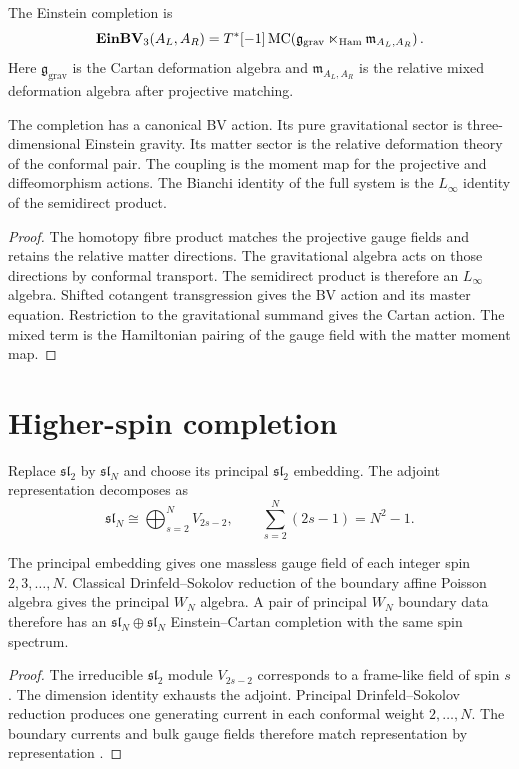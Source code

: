 \begin{definition}
The Einstein completion is
\[
 \mathbf{EinBV}_3(A_L,A_R)
 =T^*[-1]\operatorname{MC}\!\left(
   \mathfrak g_{\mathrm{grav}}
   \ltimes_{\mathrm{Ham}}
   \mathfrak m_{A_L,A_R}
  \right).
\]
Here $\mathfrak g_{\mathrm{grav}}$ is the Cartan deformation algebra and $\mathfrak m_{A_L,A_R}$ is the relative mixed deformation algebra after projective matching.
\end{definition}

\begin{theorem}
The completion has a canonical BV action.  Its pure gravitational sector is three-dimensional Einstein gravity.  Its matter sector is the relative deformation theory of the conformal pair.  The coupling is the moment map for the projective and diffeomorphism actions.  The Bianchi identity of the full system is the $L_\infty$ identity of the semidirect product.
\end{theorem}
\begin{proof}
The homotopy fibre product matches the projective gauge fields and retains the relative matter directions.  The gravitational algebra acts on those directions by conformal transport.  The semidirect product is therefore an $L_\infty$ algebra.  Shifted cotangent transgression gives the BV action and its master equation.  Restriction to the gravitational summand gives the Cartan action.  The mixed term is the Hamiltonian pairing of the gauge field with the matter moment map.
\end{proof}

\chapter{Higher-spin completion}
Replace $\mathfrak{sl}_2$ by $\mathfrak{sl}_N$ and choose its principal $\mathfrak{sl}_2$ embedding.  The adjoint representation decomposes as
\[
 \mathfrak{sl}_N
 \cong\bigoplus_{s=2}^{N}V_{2s-2},
 \qquad
 \sum_{s=2}^{N}(2s-1)=N^2-1.
\]

\begin{theorem}
The principal embedding gives one massless gauge field of each integer spin $2,3,\ldots,N$.  Classical Drinfeld--Sokolov reduction of the boundary affine Poisson algebra gives the principal $W_N$ algebra.  A pair of principal $W_N$ boundary data therefore has an $\mathfrak{sl}_N\oplus\mathfrak{sl}_N$ Einstein--Cartan completion with the same spin spectrum.
\end{theorem}
\begin{proof}
The irreducible $\mathfrak{sl}_2$ module $V_{2s-2}$ corresponds to a frame-like field of spin $s$.  The dimension identity exhausts the adjoint.  Principal Drinfeld--Sokolov reduction produces one generating current in each conformal weight $2,\ldots,N$.  The boundary currents and bulk gauge fields therefore match representation by representation 
\cite{CampoleoniHigherSpin,HenneauxRey}.
\end{proof}


